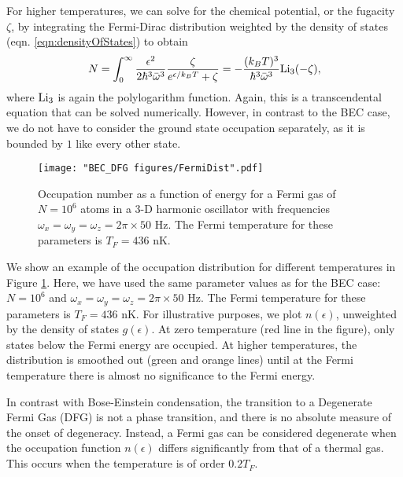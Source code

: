 For higher temperatures, we can solve for the chemical potential, or the fugacity $\zeta$, by integrating the Fermi-Dirac distribution weighted by the density of states (eqn. \ref{eqn:densityOfStates}) to obtain
\begin{equation}
N = \int_0^{\infty} \frac{\epsilon^2}{2\hbar^3 \bar{\omega}^3}\frac{\zeta}{e^{\epsilon/k_B T}+\zeta} = -\frac{(k_BT)^3}{\hbar^3 \bar{\omega}^3}{\rm Li}_3(-\zeta),
\end{equation}
where ${\rm Li}_3$ is again the polylogarithm function. Again, this is a transcendental equation that can be solved numerically. However, in contrast to the BEC case, we do not have to consider the ground state occupation separately, as it is bounded by $1$ like every other state. 

\begin{figure}
	\texttt{[image: "BEC\_DFG figures/FermiDist".pdf]}
\caption[Occupation number as a function of energy for a Fermi gas]{Occupation number as a function of energy for a Fermi gas of $N=10^6$ atoms in a 3-D harmonic oscillator with frequencies $\omega_x=\omega_y=\omega_z=2\pi \times50$ Hz. The Fermi temperature for these parameters is $T_F=436$ nK.}
\label{fig:FermiDist}
\end{figure}

We show an example of the occupation distribution for different temperatures in Figure \ref{fig:FermiDist}. Here, we have used the same parameter values as for the BEC case: $N=10^6$ and $\omega_x=\omega_y=\omega_z=2\pi\times 50$ Hz. The Fermi temperature for these parameters is $T_F=436$ nK.  For illustrative purposes, we plot $n(\epsilon)$, unweighted by the density of states $g(\epsilon)$. At zero temperature (red line in the figure), only states below the Fermi energy are occupied. At higher temperatures, the distribution is smoothed out (green and orange lines) until at the Fermi temperature there is almost no significance to the Fermi energy.

In contrast with Bose-Einstein condensation, the transition to a Degenerate Fermi Gas (DFG) is not a phase transition, and there is no absolute measure of the onset of degeneracy. Instead, a Fermi gas can be considered degenerate when the occupation function $n(\epsilon)$ differs significantly from that of a thermal gas. This occurs when the temperature is of order $0.2 T_F$. 

